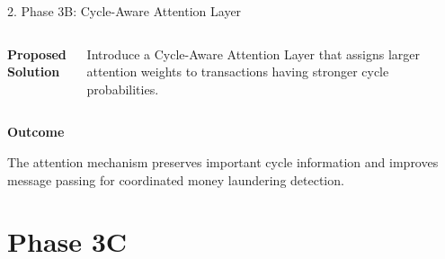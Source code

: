 \documentclass[aspectratio=169,11pt]{beamer}
\begin{document}
\begin{frame}{2. Phase 3B: Cycle-Aware Attention Layer}
\begin{columns}[T]
\vspace{0.18cm}
\raggedright
{\footnotesize
\textbf{Proposed Solution}

Introduce a Cycle-Aware Attention Layer that assigns larger attention weights to transactions having stronger cycle probabilities.
}

\end{columns}

\vspace{0.15cm}

{\footnotesize
\textbf{Outcome}

The attention mechanism preserves important cycle information and improves message passing for coordinated money laundering detection.
}

\end{frame}


\section{Phase 3C}
\end{document}
